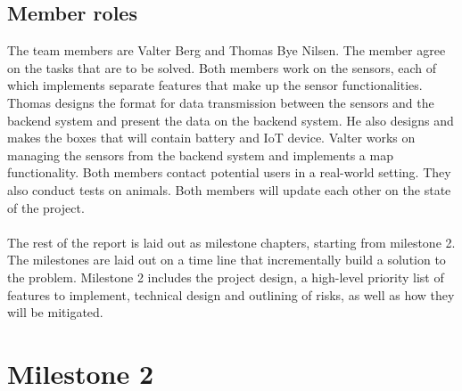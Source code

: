 	\subsection{Member roles}
		The team members are Valter Berg and Thomas Bye Nilsen. The member agree on the tasks that are to be solved. Both members work on the sensors, each of which implements separate features that make up the sensor functionalities. Thomas designs the format for data transmission between the sensors and the backend system and present the data on the backend system. He also designs and makes the boxes that will contain battery and IoT device. Valter works on managing the sensors from the backend system and implements a map functionality. Both members contact potential users in a real-world setting. They also conduct tests on animals. Both members will update each other on the state of the project.
		\\\\
		The rest of the report is laid out as milestone chapters, starting from milestone 2. The milestones are laid out on a time line that incrementally build a solution to the problem. Milestone 2 includes the project design, a high-level priority list of features to implement, technical design and outlining of risks, as well as how they will be mitigated. 
		
		
		


\section{Milestone 2}
